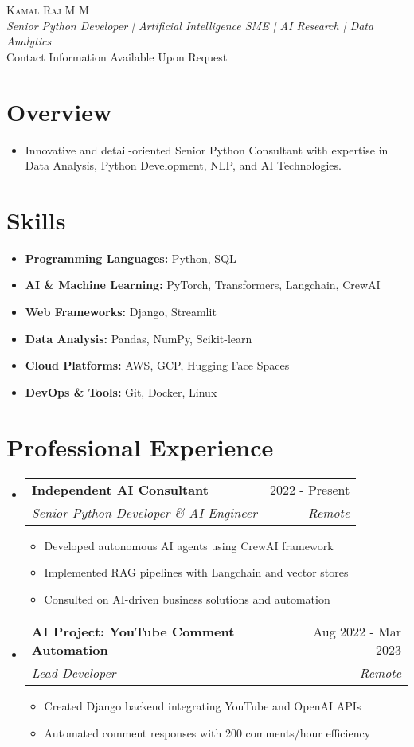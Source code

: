 \documentclass[11pt,a4paper]{article}
\makeatletter
\newcommand{\resumeItem}[1]{\item #1}
\newcommand{\resumeSubheading}[4]{
  \vspace{-2pt}\item
    \begin{tabular*}{0.97\textwidth}[t]{l@{\extracolsep{\fill}}r}
      \textbf{#1} & #2 \\
      \textit{\small#3} & \textit{\small #4} \\
    \end{tabular*}\vspace{-7pt}
}
\makeatother
\begin{document}
\begin{center}
    {\Huge \scshape Kamal Raj M M} \\ \vspace{5pt}
    \textit{Senior Python Developer | Artificial Intelligence SME | AI Research | Data Analytics} \\ \vspace{3pt}
    \small
    Contact Information Available Upon Request
\end{center}

\section{Overview}
\begin{itemize}[leftmargin=*]
    \resumeItem{Innovative and detail-oriented Senior Python Consultant with expertise in Data Analysis, Python Development, NLP, and AI Technologies.}
\end{itemize}

\section{Skills}
\begin{itemize}[leftmargin=*]
    \item \textbf{Programming Languages:} Python, SQL
    \item \textbf{AI \& Machine Learning:} PyTorch, Transformers, Langchain, CrewAI
    \item \textbf{Web Frameworks:} Django, Streamlit
    \item \textbf{Data Analysis:} Pandas, NumPy, Scikit-learn
    \item \textbf{Cloud Platforms:} AWS, GCP, Hugging Face Spaces
    \item \textbf{DevOps \& Tools:} Git, Docker, Linux
\end{itemize}

\section{Professional Experience}
\begin{itemize}[leftmargin=*]
    \resumeSubheading
      {Independent AI Consultant}{2022 - Present}
      {Senior Python Developer \& AI Engineer}{Remote}
      \begin{itemize}[leftmargin=*]
        \resumeItem{Developed autonomous AI agents using CrewAI framework}
        \resumeItem{Implemented RAG pipelines with Langchain and vector stores}
        \resumeItem{Consulted on AI-driven business solutions and automation}
      \end{itemize}

    \resumeSubheading
      {AI Project: YouTube Comment Automation}{Aug 2022 - Mar 2023}
      {Lead Developer}{Remote}
      \begin{itemize}[leftmargin=*]
        \resumeItem{Created Django backend integrating YouTube and OpenAI APIs}
        \resumeItem{Automated comment responses with 200 comments/hour efficiency}
      \end{itemize}
\end{itemize}
\end{document}
